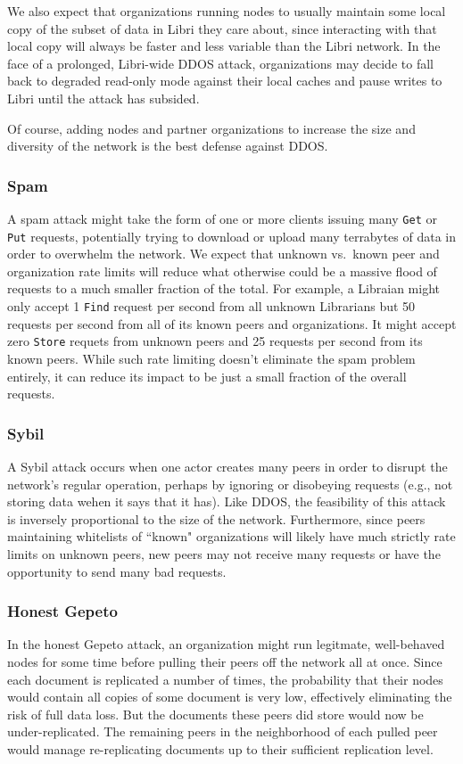 \documentclass[10pt]{article}
\newcommand{\ttt}[1]{\texttt{#1}}
\def\Put{\ttt{Put}}
\def\Get{\ttt{Get}}
\begin{document}
We also expect that organizations running nodes to usually maintain some local copy of the subset of data in Libri they care about, since interacting with that local copy will always be faster and less variable than the Libri network. In the face of a prolonged, Libri-wide DDOS attack, organizations may decide to fall back to degraded read-only mode against their local caches and pause writes to Libri until the attack has subsided.

Of course, adding nodes and partner organizations to increase the size and diversity of the network is the best defense against DDOS.

\subsubsection{Spam}
A spam attack might take the form of one or more clients issuing many \Get{} or \Put{} requests, potentially trying to download or upload many terrabytes of data in order to overwhelm the network. We expect that unknown vs.\ known peer and organization rate limits will reduce what otherwise could be a massive flood of requests to a much smaller fraction of the total. For example, a Libraian might only accept 1 \ttt{Find} request per second from all unknown Librarians but 50 requests per second from all of its known peers and organizations. It might accept zero \ttt{Store} requets from unknown peers and 25 requests per second from its known peers. While such rate limiting doesn't eliminate the spam problem entirely, it can reduce its impact to be just a small fraction of the overall requests.

\subsubsection{Sybil}
A Sybil attack occurs when one actor creates many peers in order to disrupt the network's regular operation, perhaps by ignoring or disobeying requests (e.g., not storing data wehen it says that it has). Like DDOS, the feasibility of this attack is inversely proportional to the size of the network. Furthermore, since peers maintaining whitelists of ``known" organizations will likely have much strictly rate limits on unknown peers, new peers may not receive many requests or have the opportunity to send many bad requests.

\subsubsection{Honest Gepeto}
In the honest Gepeto \cite{storj} attack, an organization might run legitmate, well-behaved nodes for some time before pulling their peers off the network all at once. Since each document is replicated a number of times, the probability that their nodes would contain all copies of some document is very low, effectively eliminating the risk of full data loss. But the documents these peers did store would now be under-replicated. The remaining peers in the neighborhood of each pulled peer would manage re-replicating documents up to their sufficient replication level.
\end{document}
